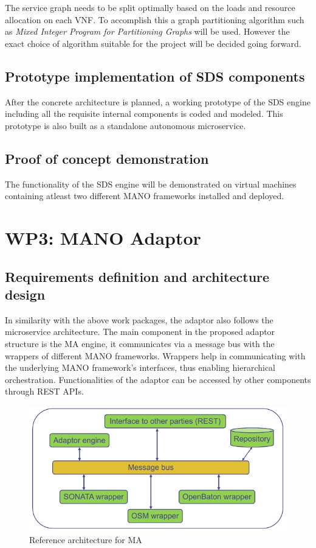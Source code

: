The service graph needs to be split optimally based on the loads and resource allocation on each VNF. To accomplish this a graph partitioning algorithm such as \textit{Mixed Integer Program for Partitioning Graphs} \cite{MIPPG} will be used. However the exact choice of algorithm suitable for the project will be decided going forward.
\subsection{Prototype implementation of SDS components}

After the concrete architecture is planned, a working prototype of the SDS engine including all the requisite internal components is coded and modeled. This prototype is also built as a standalone autonomous microservice.
\subsection{Proof of concept demonstration}

The functionality of the SDS engine will be demonstrated on virtual machines containing atleast two different MANO frameworks installed and deployed. 

\section{WP3: MANO Adaptor}

\subsection{Requirements definition and architecture design}
In similarity with the above work packages, the adaptor also follows the microservice architecture. The main component in the proposed adaptor structure is the MA engine,  it communicates via a message bus with the wrappers of different MANO frameworks. Wrappers help in communicating with the underlying MANO framework's interfaces, thus enabling hierarchical orchestration. Functionalities of the adaptor can be accessed by other components through REST APIs.

\begin{figure}[h]
	\centering
	\includegraphics[width=0.9\linewidth]{figures/wp3Arch}
	\caption{Reference architecture for MA \cite{WPDescriptionsPDF}}
	\label{fig:wp3arch}
\end{figure}

